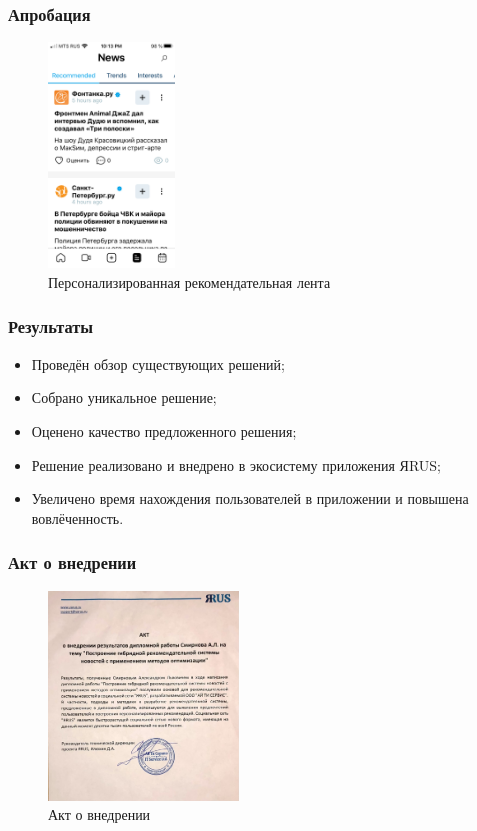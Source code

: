 \documentclass[xetex,mathserif,serif]{beamer}
\begin{document}
\begin{frame}
	\frametitle{Апробация}

    \begin{figure}[h]
        \includegraphics[width=0.3\textwidth]{./images/screenshot.png}
        \caption{Персонализированная рекомендательная лента}
        \label{fig:feed}
        \centering
    \end{figure}

\end{frame}


\begin{frame}
	\frametitle{Результаты}
	\begin{itemize}
		\item Проведён обзор существующих решений;
		\item Собрано уникальное решение;
		\item Оценено качество предложенного решения;
		\item Решение реализовано и внедрено в экосистему приложения ЯRUS;
		\item Увеличено время нахождения пользователей в приложении и повышена вовлёченность.
	\end{itemize}
\end{frame}


\begin{frame}
	\frametitle{Акт о внедрении}

    \begin{figure}[h]
        \includegraphics[width=0.45\textwidth]{./images/akt.jpg}
        \caption{Акт о внедрении}
        \label{fig:akt}
        \centering
    \end{figure}

\end{frame}
\end{document}
